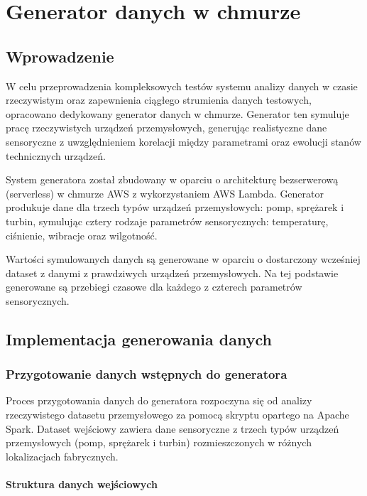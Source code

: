 \chapter{Generator danych w chmurze}
\label{chap:generator_danych}

\section{Wprowadzenie}
\label{sec:generator_wprowadzenie}

W celu przeprowadzenia kompleksowych testów systemu analizy danych w czasie rzeczywistym oraz zapewnienia ciągłego strumienia danych testowych, opracowano dedykowany generator danych w chmurze. Generator ten symuluje pracę rzeczywistych urządzeń przemysłowych, generując realistyczne dane sensoryczne z uwzględnieniem korelacji między parametrami oraz ewolucji stanów technicznych urządzeń.

System generatora został zbudowany w oparciu o architekturę bezserwerową (serverless) w chmurze AWS z wykorzystaniem AWS Lambda. Generator produkuje dane dla trzech typów urządzeń przemysłowych: pomp, sprężarek i turbin, symulując cztery rodzaje parametrów sensorycznych: temperaturę, ciśnienie, wibracje oraz wilgotność.

Wartości symulowanych danych są generowane w oparciu o dostarczony wcześniej dataset z danymi z prawdziwych urządzeń przemysłowych. Na tej podstawie generowane są przebiegi czasowe dla każdego z czterech parametrów sensorycznych.


\section{Implementacja generowania danych}
\label{sec:implementacja_generowania}

\subsection{Przygotowanie danych wstępnych do generatora}

Proces przygotowania danych do generatora rozpoczyna się od analizy rzeczywistego datasetu przemysłowego za pomocą skryptu opartego na Apache Spark. Dataset wejściowy zawiera dane sensoryczne z trzech typów urządzeń przemysłowych (pomp, sprężarek i turbin) rozmieszczonych w różnych lokalizacjach fabrycznych.

\subsubsection{Struktura danych wejściowych}

